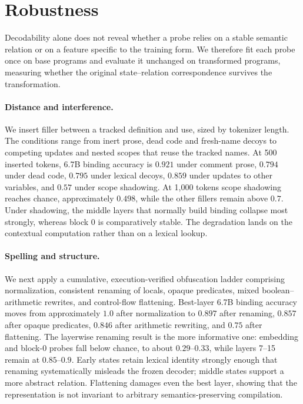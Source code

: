 \documentclass{article}
\begin{document}
\section{Robustness}
\label{sec:robustness}

Decodability alone does not reveal whether a probe relies on a stable semantic relation or on a feature specific to the training form. We therefore fit each probe once on base programs and evaluate it unchanged on transformed programs, measuring whether the original state--relation correspondence survives the transformation.

\paragraph{Distance and interference.}
We insert filler between a tracked definition and use, sized by tokenizer length. The conditions range from inert prose, dead code and fresh-name decoys to competing updates and nested scopes that reuse the tracked names. At 500 inserted tokens, 6.7B binding accuracy is $0.921$ under comment prose, $0.794$ under dead code, $0.795$ under lexical decoys, $0.859$ under updates to other variables, and $0.57$ under scope shadowing. At 1,000 tokens scope shadowing reaches chance, approximately $0.498$, while the other fillers remain above $0.7$. Under shadowing, the middle layers that normally build binding collapse most strongly, whereas block 0 is comparatively stable. The degradation lands on the contextual computation rather than on a lexical lookup.

\paragraph{Spelling and structure.}
We next apply a cumulative, execution-verified obfuscation ladder comprising normalization, consistent renaming of locals, opaque predicates, mixed boolean--arithmetic rewrites, and control-flow flattening. Best-layer 6.7B binding accuracy moves from approximately $1.0$ after normalization to $0.897$ after renaming, $0.857$ after opaque predicates, $0.846$ after arithmetic rewriting, and $0.75$ after flattening. The layerwise renaming result is the more informative one: embedding and block-0 probes fall below chance, to about $0.29$--$0.33$, while layers 7--15 remain at $0.85$--$0.9$. Early states retain lexical identity strongly enough that renaming systematically misleads the frozen decoder; middle states support a more abstract relation. Flattening damages even the best layer, showing that the representation is not invariant to arbitrary semantics-preserving compilation.
\end{document}
